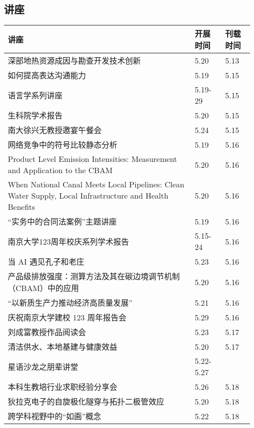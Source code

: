 \documentclass[letterpaper, 12pt]{article}
\begin{document}
\begin{multicols}{2}
\pagebreak

\section{讲座}
\begin{tabular}{|>{\centering\arraybackslash}m{}|m{}|m{}|}
    \hline
    讲座 & 开展时间 & 刊载时间\\
    \hline\hline
    深部地热资源成因与勘查开发技术创新 & 5.20 & 5.13\\\hline
    如何提高表达沟通能力 & 5.19 & 5.15\\\hline
    语言学系列讲座 & 5.19-29 & 5.15\\\hline
    生科院学术报告 & 5.20 & 5.15\\\hline
    南大徐兴无教授邀宴午餐会 & 5.24 & 5.15\\\hline
    网络竞争中的符号比较静态分析 & 5.19 & 5.16\\\hline
    Product  Level Emission Intensities: Measurement and Application to the CBAM & 5.20 & 5.16\\\hline
    When  National Canal Meets Local Pipelines: Clean Water Supply, Local Infrastructure  and Health Benefits & 5.20 & 5.16\\\hline
    “实务中的合同法案例”主题讲座 & 5.19 & 5.16\\\hline
    南京大学123周年校庆系列学术报告 & 5.15-24 & 5.16\\\hline
    当 AI 遇见孔子和老庄 & 5.23 & 5.16\\\hline
    产品级排放强度：测算方法及其在碳边境调节机制（CBAM）中的应用 & 5.20 & 5.16\\\hline
    “以新质生产力推动经济高质量发展” & 5.21 & 5.16\\\hline
     庆祝南京大学建校 123 周年报告会 & 5.29 & 5.16\\\hline
     刘成富教授作品阅读会 & 5.23 & 5.17\\\hline
     清洁供水、本地基建与健康效益 & 5.20 & 5.17\\\hline
     星语沙龙之朋辈讲堂 & 5.22-5.27\\\hline
     本科生教培行业求职经验分享会 & 5.26 & 5.18\\\hline
     狄拉克电子的自旋极化隧穿与拓扑二极管效应 & 5.20 & 5.18\\\hline
     跨学科视野中的“如画”概念 & 5.22 & 5.18\\\hline
    \end{tabular}

\end{multicols}
\end{document}
